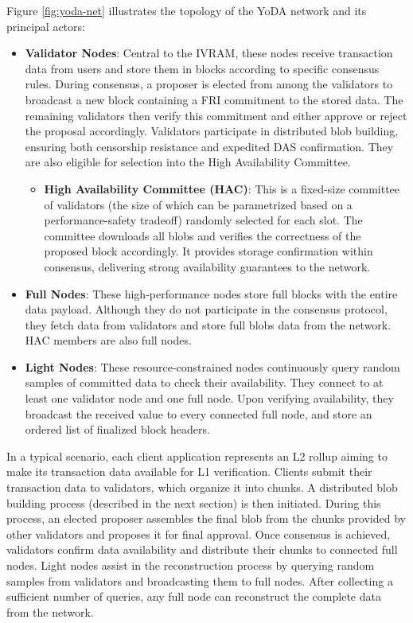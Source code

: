 \documentclass[11pt]{article}
\begin{document}
Figure \ref{fig:yoda-net} illustrates the topology of the YoDA network and its principal actors:

\begin{itemize}
    \item \textbf{Validator Nodes}: Central to the IVRAM, these nodes receive transaction data from users and store them in blocks according to specific consensus rules. During consensus, a proposer is elected from among the validators to broadcast a new block containing a FRI commitment to the stored data. The remaining validators then verify this  commitment and either approve or reject the proposal accordingly. Validators participate in distributed blob building, ensuring both censorship resistance and expedited DAS confirmation. They are also eligible for selection into the High Availability Committee.
    \begin{itemize}
        \item \textbf{High Availability Committee (HAC)}: This is a fixed-size committee of validators (the size of which can be parametrized based on a performance-safety tradeoff) randomly selected for each slot. The committee downloads all blobs and verifies the correctness of the proposed block accordingly. It provides storage confirmation within consensus, delivering strong availability guarantees to the network.
    \end{itemize}
    \item \textbf{Full Nodes}: These high-performance nodes store full blocks with the entire data payload. Although they do not participate in the consensus protocol, they fetch data from validators and store full blobs data from the network. HAC members are also full nodes.
    \item \textbf{Light Nodes}: These resource-constrained nodes continuously query random samples of committed data to check their availability. They connect to at least one validator node and one full node. Upon verifying availability, they broadcast the received value to every connected full node, and store an ordered list of finalized block headers.
\end{itemize}

In a typical scenario, each client application represents an L2 rollup aiming to make its transaction data available for L1 verification. Clients submit their transaction data to validators, which organize it into chunks. A distributed blob building process (described in the next section) is then initiated. During this process, an elected proposer assembles the final blob from the chunks provided by other validators and proposes it for final approval. Once consensus is achieved, validators confirm data availability and distribute their chunks to connected full nodes. Light nodes assist in the reconstruction process by querying random samples from validators and broadcasting them to full nodes. After collecting a sufficient number of queries, any full node can reconstruct the complete data from the network.
\end{document}

